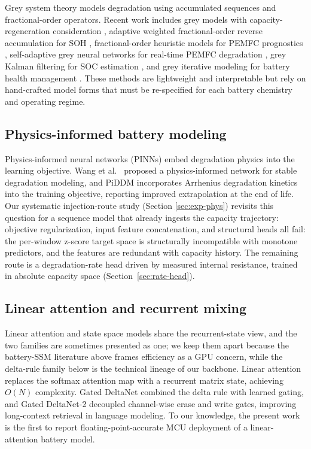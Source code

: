 \documentclass[final,5p,times,twocolumn]{elsarticle}
\begin{document}
Grey system theory models degradation using accumulated sequences and
fractional-order operators. Recent work includes grey models with
capacity-regeneration consideration \cite{ref_grey_hybrid}, adaptive
weighted fractional-order reverse accumulation for SOH
\cite{ref_grey_frac}, fractional-order heuristic models for PEMFC
prognostics \cite{ref_grey_pemfc}, self-adaptive grey neural networks
for real-time PEMFC degradation \cite{ref_grey_nn}, grey Kalman
filtering for SOC estimation \cite{ref_grey_kalman}, and grey
iterative modeling for battery health management \cite{ref_grey_iter}.
These methods are lightweight and interpretable but rely on
hand-crafted model forms that must be re-specified for each battery
chemistry and operating regime.

\subsection{Physics-informed battery modeling}

Physics-informed neural networks (PINNs) embed degradation physics
into the learning objective. Wang et al.\ \cite{ref_wang_pinn}
proposed a physics-informed network for stable degradation modeling,
and PiDDM \cite{ref_piddm} incorporates Arrhenius degradation kinetics
into the training objective, reporting improved extrapolation at the
end of life. Our systematic injection-route study (Section
\ref{sec:exp-phys}) revisits this question for a sequence model that
already ingests the capacity trajectory: objective regularization,
input feature concatenation, and structural heads all fail: the
per-window z-score target space is structurally incompatible with
monotone predictors, and the features are redundant with capacity
history. The remaining route is a degradation-rate head driven by
measured internal resistance, trained in absolute capacity space
(Section~\ref{sec:rate-head}).

\subsection{Linear attention and recurrent mixing}

Linear attention and state space models share the recurrent-state
view, and the two families are sometimes presented as one; we keep
them apart because the battery-SSM literature above frames
efficiency as a GPU concern, while the delta-rule family below is
the technical lineage of our backbone. Linear attention replaces the softmax attention map with a recurrent
matrix state, achieving $O(N)$ complexity. Gated DeltaNet
\cite{ref_gdn} combined the delta rule with learned gating, and
Gated DeltaNet-2 \cite{ref_gdn2} decoupled channel-wise erase
and write gates, improving long-context retrieval in language
modeling. To our knowledge, the present work is the first to report
floating-point-accurate MCU deployment of a linear-attention battery model.
\end{document}
